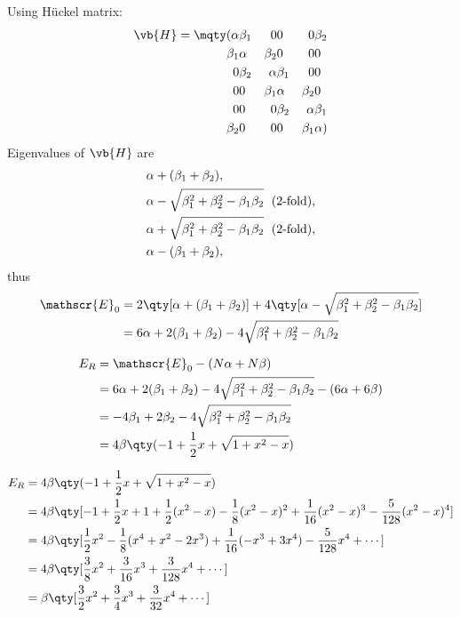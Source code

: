 \documentclass[a4paper]{article}
\begin{document}
Using H\"uckel matrix:
\begin{align}
\vb{H} = \mqty( 
\alpha  & \beta_1 & 0       & 0       & 0       & \beta_2\\
\beta_1 & \alpha  & \beta_2 & 0       & 0       & 0      \\
0       & \beta_2 & \alpha  & \beta_1 & 0       & 0      \\
0       & 0       & \beta_1 & \alpha  & \beta_2 & 0      \\
0       & 0       & 0       & \beta_2 & \alpha  & \beta_1\\
\beta_2 & 0       & 0       & 0       & \beta_1 & \alpha  
)
\end{align}
Eigenvalues of $ \vb{H} $ are
\begin{align}\label{key}
&\alpha + (\beta_1 + \beta_2), \notag\\
&\alpha - \sqrt{\beta_1^2 + \beta_2^2 - \beta_1\beta_2} \;\text{ (2-fold)}, \notag\\
&\alpha + \sqrt{\beta_1^2 + \beta_2^2 - \beta_1\beta_2} \;\text{ (2-fold)}, \notag\\
&\alpha - (\beta_1 + \beta_2),
\end{align}
thus
\begin{align}
\mathscr{E}_0 &= 2\qty[\alpha + (\beta_1 + \beta_2)] + 4\qty[\alpha - \sqrt{\beta_1^2 + \beta_2^2 - \beta_1\beta_2}] \notag\\
&= 6\alpha + 2(\beta_1 + \beta_2) - 4\sqrt{\beta_1^2 + \beta_2^2 - \beta_1\beta_2}
\end{align}

\begin{align}
E_R &= \mathscr{E}_0 - (N\alpha + N\beta) \notag\\
&= 6\alpha + 2(\beta_1 + \beta_2) - 4\sqrt{\beta_1^2 + \beta_2^2 - \beta_1\beta_2} - (6\alpha + 6\beta) \notag\\
&= -4\beta_1 + 2\beta_2 - 4\sqrt{\beta_1^2 + \beta_2^2 - \beta_1\beta_2} \notag\\
&= 4\beta\qty(-1 + \dfrac{1}{2}x + \sqrt{1 + x^2 - x})
\end{align}

\begin{align}
E_R &= 4\beta\qty(-1 + \dfrac{1}{2}x + \sqrt{1 + x^2 - x}) \notag\\
&= 4\beta\qty[ -1 + \dfrac{1}{2}x 
+ 1 + \dfrac{1}{2}(x^2-x) - \dfrac{1}{8}(x^2-x)^2 + \dfrac{1}{16}(x^2-x)^3 - \dfrac{5}{128}(x^2-x)^4 ] \notag\\
&= 4\beta\qty[ 
\dfrac{1}{2}x^2 - \dfrac{1}{8}(x^4 + x^2 - 2x^3) 
+ \dfrac{1}{16}(-x^3 + 3x^4) - \dfrac{5}{128}x^4 + \cdots ] \notag\\
&= 4\beta\qty[ 
\dfrac{3}{8}x^2 + \dfrac{3}{16}x^3 + \dfrac{3}{128}x^4 + \cdots ] \notag\\
&= \beta\qty[ 
\dfrac{3}{2}x^2 + \dfrac{3}{4}x^3 + \dfrac{3}{32}x^4 + \cdots ]
\end{align}
\end{document}
